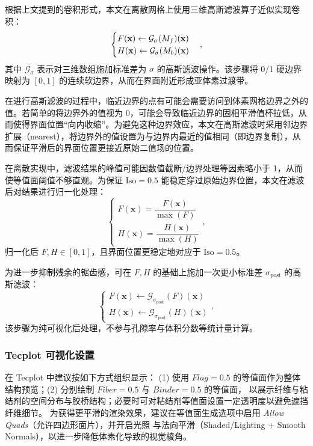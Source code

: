 根据上文提到的卷积形式，本文在离散网格上使用三维高斯滤波算子近似实现卷积：
\begin{equation}
\begin{cases}
F(\textbf{x}) \leftarrow \mathcal{G}_{\sigma}(M_f)(\textbf x)\\
H(\textbf{x}) \leftarrow \mathcal{G}_{\sigma}(M_b)(\textbf x)
\end{cases}
,
\end{equation}
其中 $\mathcal{G}_{\sigma}$ 表示对三维数组施加标准差为 $\sigma$ 的高斯滤波操作。该步骤将 0/1 硬边界映射为 $[0,1]$ 的连续软边界，从而在界面附近形成亚体素过渡带。

在进行高斯滤波的过程中，临近边界的点有可能会需要访问到体素网格边界之外的值。若简单的将边界外的值视为 0，可能会导致临近边界的固相平滑值杯拉低，从而使得界面位置“向内收缩”。为避免这种边界效应，本文在高斯滤波时采用邻边界扩展（nearest），将边界外的值设置为与边界内最近的值相同（即边界复制），从而保证平滑后的界面位置更接近原始二值场的位置。

在离散实现中，滤波结果的峰值可能因数值截断/边界处理等因素略小于 1，从而使等值面阈值不够直观。为保证 $\mathrm{Iso}=0.5$ 能稳定穿过原始边界位置，本文在滤波后对结果进行归一化处理：
\begin{equation}
\begin{cases}
F(\textbf{x}) = \dfrac{F(\textbf{x})}{\max(F)}\\
H(\textbf{x}) = \dfrac{H(\textbf{x})}{\max(H)}
\end{cases}
,
\end{equation}
归一化后 $F,H \in [0,1]$，且界面位置更稳定地对应于 $\mathrm{Iso}=0.5$。

为进一步抑制残余的锯齿感，可在 $F,H$ 的基础上施加一次更小标准差 $\sigma_{\text{post}}$ 的高斯滤波：
\begin{equation}
\begin{cases}
    F(\textbf{x}) \leftarrow \mathcal{G}_{\sigma_{\text{post}}}(F)(\textbf{x})\\
    H(\textbf{x}) \leftarrow \mathcal{G}_{\sigma_{\text{post}}}(H)(\textbf{x})
\end{cases}
,
\end{equation}
该步骤为纯可视化后处理，不参与孔隙率与体积分数等统计量计算。

\subsubsection{\textbf{Tecplot 可视化设置}}

在 Tecplot 中建议按如下方式组织显示：
(1) 使用 $Flag=0.5$ 的等值面作为整体结构预览；(2) 分别绘制 $Fiber=0.5$ 与 $Binder=0.5$ 的等值面，
以展示纤维与粘结剂的空间分布与胶桥结构；必要时可对粘结剂等值面设置一定透明度以避免遮挡纤维细节。
为获得更平滑的渲染效果，建议在等值面生成选项中启用 \textit{Allow Quads}（允许四边形面片），并开启光照
与法向平滑（Shaded/Lighting + Smooth Normals），以进一步降低体素化导致的视觉棱角。
